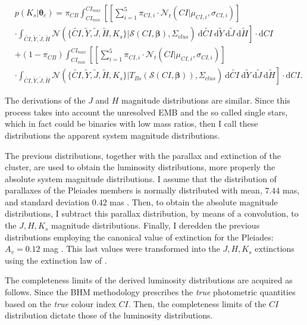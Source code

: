 \begin{align}
&p(K_s | \boldsymbol{\theta}_c)  =   \pi_{CB} \int_{CI_{min}}^{CI_{max}}\left[ \left[\sum_{i=1}^5 \pi_{CI,i} \cdot \mathcal{N}_t(CI| \mu_{CI,i},\sigma_{CI,i})\right]\right. \nonumber \\
&\cdot  \left.\int_{\tilde{CI},\tilde{Y},\tilde{J},\tilde{H}}\mathcal{N}(\{\tilde{CI},\tilde{Y},\tilde{J},\tilde{H},K_s\}|\boldsymbol{\mathcal{S}}(CI, \boldsymbol{\beta}),\Sigma_{clus})~\mathrm{d}\tilde{CI}~\mathrm{d}\tilde{Y}~\mathrm{d}\tilde{J}~\mathrm{d}\tilde{H}\right] \cdot \mathrm{d}CI \nonumber \\
& + (1-\pi_{CB}) \int_{CI_{min}}^{CI_{max}}\left[\left[\sum_{i=1}^5 \pi_{CI,i} \cdot \mathcal{N}_t(CI| \mu_{CI,i},\sigma_{CI,i})\right]\right.\nonumber\\
&\cdot \left. \int_{\tilde{CI},\tilde{Y},\tilde{J},\tilde{H}}\mathcal{N}(\{\tilde{CI},\tilde{Y},\tilde{J},\tilde{H},K_s\}|T_{Bs}(\boldsymbol{\mathcal{S}}(CI, \boldsymbol{\beta})),\Sigma_{clus})~\mathrm{d}\tilde{CI}~\mathrm{d}\tilde{Y}~\mathrm{d}\tilde{J}~\mathrm{d}\tilde{H}\right]\cdot \mathrm{d}CI. \nonumber 
\end{align}

The derivations of the $J$ and $H$ magnitude distributions are similar. Since this process takes into account the unresolved EMB and the so called single stars, which in fact could be binaries with low mass ratios, then I call these distributions the apparent system magnitude distributions. 

The previous distributions, together with the parallax and extinction of the cluster, are used to obtain the luminosity distributions, more properly the absolute system magnitude distributions. I assume that the distribution of parallaxes of the Pleiades members is normally distributed with mean, $7.44$ mas, and standard deviation $0.42$ mas \citep{Galli2017}. Then, to obtain the absolute magnitude distributions, I subtract this parallax distribution, by means of a convolution, to the $J,H,K_s$ magnitude distributions. Finally, I deredden the previous distributions employing the canonical value of extinction for the Pleiades: $A_v=0.12$ mag \citep{Guthrie1987}. This last values were transformed into the $J,H,K_s$ extinctions using the extinction law of \citet{Cardelli1989}.

The completeness limits of the derived luminosity distributions are acquired as follows. Since the BHM methodology prescribes the \emph{true} photometric quantities based on the \emph{true} colour index $CI$. Then, the completeness limits of the $CI$ distribution dictate those of the luminosity distributions. 

